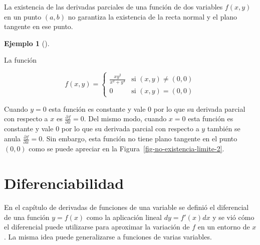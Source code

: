 \documentclass[
  a4paper,
]{scrreport}
\theoremstyle{plain}
\theoremstyle{plain}
\theoremstyle{definition}
\theoremstyle{definition}
\newtheorem{example}{Ejemplo}[chapter]
\theoremstyle{plain}
\theoremstyle{definition}
\theoremstyle{remark}
\begin{document}
\begin{tcolorbox}[enhanced jigsaw, rightrule=.15mm, toptitle=1mm, colbacktitle=quarto-callout-warning-color!10!white, bottomrule=.15mm, opacityback=0, arc=.35mm, breakable, toprule=.15mm, left=2mm, coltitle=black, colback=white, opacitybacktitle=0.6, titlerule=0mm, colframe=quarto-callout-warning-color-frame, bottomtitle=1mm, title=\textcolor{quarto-callout-warning-color}{\faExclamationTriangle}\hspace{0.5em}{Advertencia}, leftrule=.75mm]

La existencia de las derivadas parciales de una función de dos variables
\(f(x,y)\) en un punto \((a,b)\) no garantiza la existencia de la recta
normal y el plano tangente en ese punto.

\end{tcolorbox}

\begin{example}[]\protect\hypertarget{exm-funcion-sin-plano-tangente}{}\label{exm-funcion-sin-plano-tangente}

La función

\[
f(x,y) = 
\begin{cases}
\frac{xy^2}{x^2+y^4} & \mbox{si $(x,y)\neq (0,0)$}\\
0  & \mbox{si $(x,y) = (0,0)$}
\end{cases}
\]

Cuando \(y=0\) esta función es constante y vale \(0\) por lo que su
derivada parcial con respecto a \(x\) es
\(\frac{\partial f}{\partial x} = 0\). Del mismo modo, cuando \(x=0\)
esta función es constante y vale \(0\) por lo que su derivada parcial
con respecto a \(y\) también se anula
\(\frac{\partial f}{\partial x} = 0\). Sin embargo, esta función no
tiene plano tangente en el punto \((0,0)\) como se puede apreciar en la
Figura~\ref{fig-no-existencia-limite-2}.

\end{example}

\hypertarget{diferenciabilidad-1}{%
\section{Diferenciabilidad}\label{diferenciabilidad-1}}

En el capítulo de derivadas de funciones de una variable se definió el
diferencial de una función \(y=f(x)\) como la aplicación lineal
\(dy = f'(x)dx\) y se vió cómo el diferencial puede utilizarse para
aproximar la variación de \(f\) en un entorno de \(x\). La misma idea
puede generalizarse a funciones de varias variables.
\end{document}
